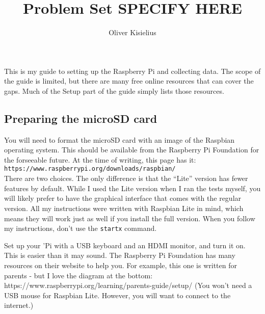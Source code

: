 \documentclass{article}
\author{Oliver Kisielius}
\title{Problem Set SPECIFY HERE}
\def\url{\texttt}
\begin{document}
This is my guide to setting up the Raspberry Pi and collecting data. The scope of
the guide is limited, but there are many free online resources that can cover the
gaps. Much of the Setup part of the guide simply lists those resources.

\subsection*{Preparing the microSD card}

You will need to format the microSD card with an image of the Raspbian operating
system. This should be available from the Raspberry Pi Foundation for the
forseeable future. At the time of writing, this page has it:\\
\url{https://www.raspberrypi.org/downloads/raspbian/}\\


There are two choices. The only difference is that the ``Lite'' version has fewer
features by default. While I used the Lite version when I ran the tests myself,
you will likely prefer to have the graphical interface that comes with the regular
version. All my instructions were written with Raspbian Lite in mind, which means
they will work just as well if you install the full version. When you follow my
instructions, don't use the \texttt{startx} command.



Set up your 'Pi with a USB keyboard and an HDMI monitor, and turn it
on.  This is easier than it may sound. The Raspberry Pi Foundation has
many resources on their website to help you. For example, this one is
written for parents - but I love the diagram at the bottom:
https://www.raspberrypi.org/learning/parents-guide/setup/
(You won't need a USB mouse for Raspbian Lite. However, you will want
to connect to the internet.)
\end{document}
